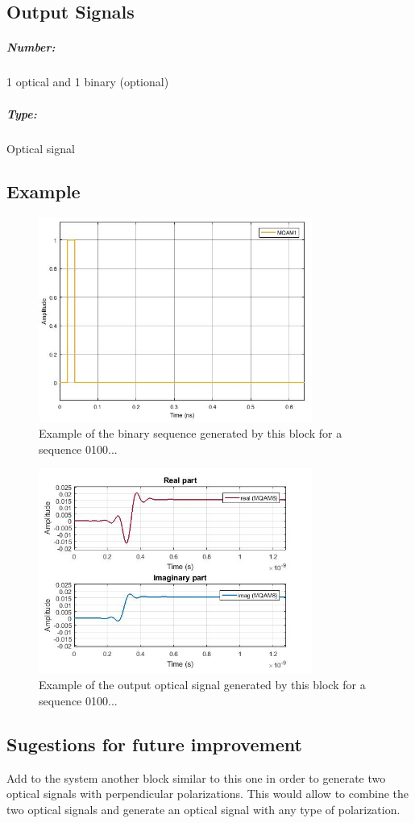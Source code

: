 \subsection*{Output Signals}

\subparagraph*{Number:} 1 optical and 1 binary (optional)

\subparagraph*{Type:} Optical signal

\subsection*{Example} 

\begin{figure}[h]
	\centering
	\includegraphics[width=0.8\textwidth]{figures/BinarySource_output}
	\caption{Example of the binary sequence generated by this block for a sequence 0100...}
\end{figure}

\begin{figure}[h]
	\centering
	\includegraphics[width=0.8\textwidth]{figures/IQmodulator0_output}
	\caption{Example of the output optical signal generated by this block for a sequence 0100...}
\end{figure}

\subsection*{Sugestions for future improvement}

Add to the system another block similar to this one in order to generate two optical signals with perpendicular polarizations. This would allow to combine the two optical signals and generate an optical signal with any type of polarization.
